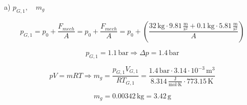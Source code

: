 a) $p_{G,1}, \quad m_g$

\[
p_{G,1} = p_0 + \frac{F_{mech}}{A} = p_0 + \frac{F_{mech}}{A} = p_0 + \left( \frac{32 \, \text{kg} \cdot 9.81 \, \frac{\text{m}}{\text{s}^2} + 0.1 \, \text{kg} \cdot 5.81 \, \frac{\text{m}}{\text{s}^2}}{A} \right)
\]

\[
p_{G,1} = 1.1 \, \text{bar} \Rightarrow \Delta p = 1.4 \, \text{bar}
\]

\[
pV = mRT \Rightarrow m_g = \frac{p_{G,1} V_{G,1}}{R T_{G,1}} = \frac{1.4 \, \text{bar} \cdot 3.14 \cdot 10^{-3} \, \text{m}^3}{8.314 \, \frac{\text{J}}{\text{mol} \cdot \text{K}} \cdot 773.15 \, \text{K}}
\]

\[
m_g = 0.00342 \, \text{kg} = 3.42 \, \text{g}
\]